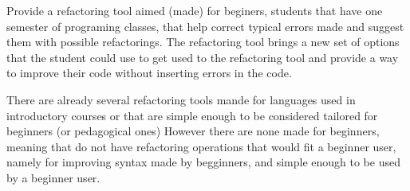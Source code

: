 Provide a refactoring tool aimed (made) for beginers, students that have one semester
of programing classes, that help correct typical errors made and suggest them
with possible refactorings.
The refactoring tool brings a new set of options that the student could use to
get used to the refactoring tool and provide a way to improve their code without
inserting errors in the code.

There are already several refactoring tools mande for languages used in introductory courses
or that are simple enough to be considered tailored for beginners (or pedagogical ones)
However there are none made for beginners, meaning that do not have refactoring operations
that would fit a beginner user, namely for improving syntax made by begginners, and
simple enough to be used by a beginner user.

